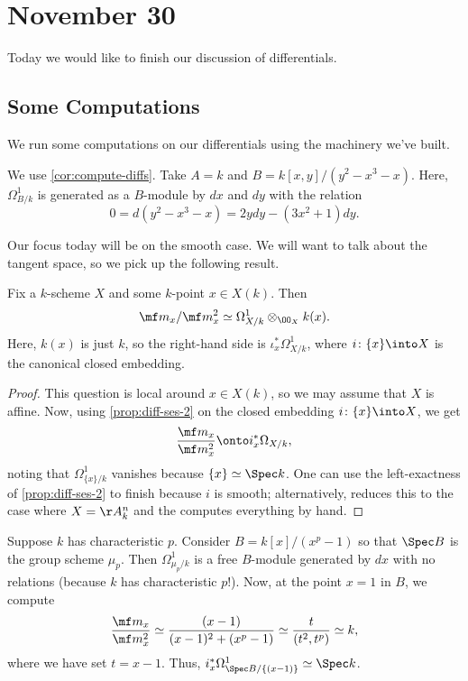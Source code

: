 \documentclass[../notes.tex]{subfiles}
\begin{document}
\section{November 30}

Today we would like to finish our discussion of differentials.

\subsection{Some Computations}
We run some computations on our differentials using the machinery we've built.
\begin{example}
	We use \autoref{cor:compute-diffs}. Take $A=k$ and $B=k[x,y]/\left(y^2-x^3-x\right)$. Here, $\Omega^1_{B/k}$ is generated as a $B$-module by $dx$ and $dy$ with the relation
	\[0=d\left(y^2-x^3-x\right)=2ydy-\left(3x^2+1\right)dy.\]
\end{example}
Our focus today will be on the smooth case. We will want to talk about the tangent space, so we pick up the following result.
\begin{corollary} \label{cor:zar-cotangent-space}
	Fix a $k$-scheme $X$ and some $k$-point $x\in X(k)$. Then
	\[\mf m_x/\mf m_x^2\simeq\Omega^1_{X/k}\otimes_{\OO_X}k(x).\]
	Here, $k(x)$ is just $k$, so the right-hand side is $\iota_x^*\Omega^1_{X/k}$, where $i\colon\{x\}\into X$ is the canonical closed embedding.
\end{corollary}
\begin{proof}
	This question is local around $x\in X(k)$, so we may assume that $X$ is affine. Now, using \autoref{prop:diff-ses-2} on the closed embedding $i\colon\{x\}\into X$, we get
	\[\frac{\mf m_x}{\mf m_x^2}\onto i_x^*\Omega_{X/k},\]
	noting that $\Omega^1_{\{x\}/k}$ vanishes because $\{x\}\simeq\Spec k$. One can use the left-exactness of \autoref{prop:diff-ses-2} to finish because $i$ is smooth; alternatively, \cite[Lemma~6.2.1]{liu-alg-geo-ari} reduces this to the case where $X=\AA^n_k$ and the computes everything by hand.
\end{proof}
\begin{example}
	Suppose $k$ has characteristic $p$. Consider $B=k[x]/\left(x^p-1\right)$ so that $\Spec B$ is the group scheme $\mu_p$. Then $\Omega^1_{\mu_p/k}$ is a free $B$-module generated by $dx$ with no relations (because $k$ has characteristic $p$!). Now, at the point $x=1$ in $B$, we compute
	\[\frac{\mf m_x}{\mf m_x^2}\simeq\frac{(x-1)}{(x-1)^2+\left(x^p-1\right)}\simeq\frac t{\left(t^2,t^p\right)}\simeq k,\]
	where we have set $t=x-1$. Thus, $i^*_x\Omega^1_{\Spec B/\{(x-1)\}}\simeq\Spec k$.
\end{example}
\end{document}
